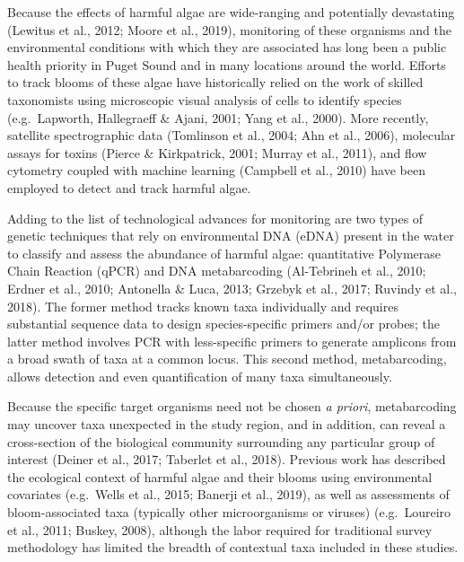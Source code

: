 \documentclass[
]{article}
\begin{document}
Because the effects of harmful algae are wide-ranging and potentially
devastating (Lewitus et al., 2012; Moore et al., 2019), monitoring of
these organisms and the environmental conditions with which they are
associated has long been a public health priority in Puget Sound and in
many locations around the world. Efforts to track blooms of these algae
have historically relied on the work of skilled taxonomists using
microscopic visual analysis of cells to identify species (e.g.~Lapworth,
Hallegraeff \& Ajani, 2001; Yang et al., 2000). More recently, satellite
spectrographic data (Tomlinson et al., 2004; Ahn et al., 2006),
molecular assays for toxins (Pierce \& Kirkpatrick, 2001; Murray et al.,
2011), and flow cytometry coupled with machine learning (Campbell et
al., 2010) have been employed to detect and track harmful algae.

Adding to the list of technological advances for monitoring are two
types of genetic techniques that rely on environmental DNA (eDNA)
present in the water to classify and assess the abundance of harmful
algae: quantitative Polymerase Chain Reaction (qPCR) and DNA
metabarcoding (Al-Tebrineh et al., 2010; Erdner et al., 2010; Antonella
\& Luca, 2013; Grzebyk et al., 2017; Ruvindy et al., 2018). The former
method tracks known taxa individually and requires substantial sequence
data to design species-specific primers and/or probes; the latter method
involves PCR with less-specific primers to generate amplicons from a
broad swath of taxa at a common locus. This second method,
metabarcoding, allows detection and even quantification of many taxa
simultaneously.

Because the specific target organisms need not be chosen \emph{a
priori}, metabarcoding may uncover taxa unexpected in the study region,
and in addition, can reveal a cross-section of the biological community
surrounding any particular group of interest (Deiner et al., 2017;
Taberlet et al., 2018). Previous work has described the ecological
context of harmful algae and their blooms using environmental covariates
(e.g.~Wells et al., 2015; Banerji et al., 2019), as well as assessments
of bloom-associated taxa (typically other microorganisms or viruses)
(e.g.~Loureiro et al., 2011; Buskey, 2008), although the labor required
for traditional survey methodology has limited the breadth of contextual
taxa included in these studies.
\end{document}
